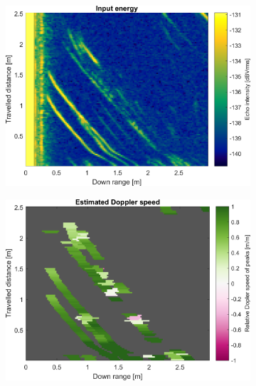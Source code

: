 \begin{figure}[htbp]
    \centering
    \begin{subfigure}[t]{0.475\linewidth}
        \centering
        \includegraphics[width=\linewidth,max height=.475\textheight]{gfx/results/nirvana_input.png}
    \end{subfigure}%
    \hfill%
    \begin{subfigure}[t]{0.475\linewidth}
        \centering
        \includegraphics[width=\linewidth,max height=.475\textheight]{gfx/results/nirvana_doppler.png}
    \end{subfigure}\bigskip\\
    \begin{subfigure}[t]{0.475\linewidth}
        \centering

\end{subfigure}
\end{figure}
